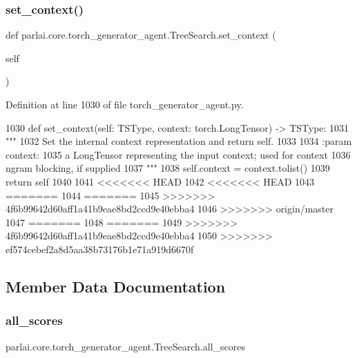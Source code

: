 \subsubsection{\texorpdfstring{set\+\_\+context()}{set\_context()}}
{\footnotesize\ttfamily def parlai.\+core.\+torch\+\_\+generator\+\_\+agent.\+Tree\+Search.\+set\+\_\+context (\begin{DoxyParamCaption}\item[{}]{self }\end{DoxyParamCaption})}



Definition at line 1030 of file torch\+\_\+generator\+\_\+agent.\+py.


\begin{DoxyCode}
1030     \textcolor{keyword}{def }set\_context(self: TSType, context: torch.LongTensor) -> TSType:
1031         \textcolor{stringliteral}{"""}
1032 \textcolor{stringliteral}{        Set the internal context representation and return self.}
1033 \textcolor{stringliteral}{}
1034 \textcolor{stringliteral}{        :param context:}
1035 \textcolor{stringliteral}{            a LongTensor representing the input context; used for context}
1036 \textcolor{stringliteral}{            ngram blocking, if supplied}
1037 \textcolor{stringliteral}{        """}
1038         self.context = context.tolist()
1039         \textcolor{keywordflow}{return} self
1040 
1041 <<<<<<< HEAD
1042 <<<<<<< HEAD
1043 =======
1044 =======
1045 >>>>>>> 4f6b99642d60aff1a41b9eae8bd2ccd9e40ebba4
1046 >>>>>>> origin/master
1047 =======
1048 =======
1049 >>>>>>> 4f6b99642d60aff1a41b9eae8bd2ccd9e40ebba4
1050 >>>>>>> ef574cebef2a8d5aa38b73176b1e71a919d6670f
\end{DoxyCode}


\subsection{Member Data Documentation}
\mbox{\label{classparlai_1_1core_1_1torch__generator__agent_1_1TreeSearch_ac9e79a3effa48d2e35ac879620cd639e}} 
\subsubsection{\texorpdfstring{all\+\_\+scores}{all\_scores}}
{\footnotesize\ttfamily parlai.\+core.\+torch\+\_\+generator\+\_\+agent.\+Tree\+Search.\+all\+\_\+scores}



